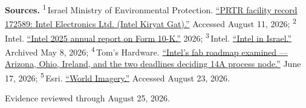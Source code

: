 \begin{minipage}[t][0.90\textheight][t]{\textwidth}
{\sffamily\scriptsize\setlength{\emergencystretch}{1.5em}\textbf{Sources.} \textsuperscript{1}\,Israel Ministry of Environmental Protection. \href{\detokenize{https://www.gov.il/apps/sviva/airq/atar_svivati_emission_details?atarsvivati=172589&layer=divuchim2020}}{\enquote{PRTR facility record 172589: Intel Electronics Ltd. (Intel Kiryat Gat).}} Accessed August 11, 2026; \textsuperscript{2}\,Intel. \href{\detokenize{https://www.intc.com/filings-reports/all-sec-filings/content/0000050863-26-000011/intc-20251227.htm}}{\enquote{Intel 2025 annual report on Form 10-K.}} 2026; \textsuperscript{3}\,Intel. \href{\detokenize{https://web.archive.org/web/20260508212537/https://www.intel.com/content/www/us/en/corporate-responsibility/intel-in-israel.html}}{\enquote{Intel in Israel.}} Archived May 8, 2026; \textsuperscript{4}\,Tom's Hardware. \href{\detokenize{https://www.tomshardware.com/tech-industry/semiconductors/intels-fab-roadmap-examined}}{\enquote{Intel's fab roadmap examined --- Arizona, Ohio, Ireland, and the two deadlines deciding 14A process node.}} June 17, 2026; \textsuperscript{5}\,Esri. \href{\detokenize{https://www.arcgis.com/home/item.html?id=10df2279f9684e4a9f6a7f08febac2a9}}{\enquote{World Imagery.}} Accessed August 23, 2026.\par}
\vfill
\noindent{\color{hairline}\rule{\linewidth}{0.4pt}}\par\smallskip
{\sffamily\scriptsize\color{black!58} Evidence reviewed through August 25, 2026.\par}
\end{minipage}
\clearpage
